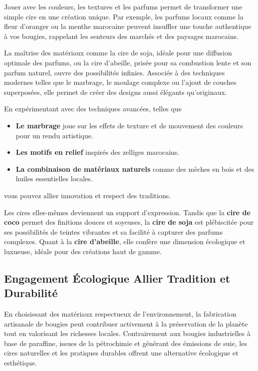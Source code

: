 \documentclass[11pt,fleqn,onecolumn,oneside]{book}
\begin{document}
Jouer avec les couleurs, les textures et les parfums permet de transformer une simple cire en une création unique. Par exemple, les parfums locaux comme la fleur d’oranger ou la menthe marocaine peuvent insuffler une touche authentique à vos bougies, rappelant les senteurs des marchés et des paysages marocains.

\begin{remark}
La maîtrise des matériaux comme la cire de soja, idéale pour une diffusion optimale des parfums, ou la cire d’abeille, prisée pour sa combustion lente et son parfum naturel, ouvre des possibilités infinies. Associée à des techniques modernes telles que le marbrage, le moulage complexe ou l’ajout de couches superposées, elle permet de créer des designs aussi élégants qu’originaux.
\end{remark}

En expérimentant avec des techniques avancées, telles que
\begin{itemize}
    \item \textbf{Le marbrage} joue sur les effets de texture et de mouvement des couleurs pour un rendu artistique.
    \item \textbf{Les motifs en relief} inspirés des zelliges marocains.
    \item \textbf{La combinaison de matériaux naturels} comme des mèches en bois et des huiles essentielles locales.
\end{itemize}
vous pouvez allier innovation et respect des traditions.

Les cires elles-mêmes deviennent un support d’expression. Tandis que la \textbf{cire de coco} permet des finitions douces et soyeuses, la \textbf{cire de soja} est plébiscitée pour ses possibilités de teintes vibrantes et sa facilité à capturer des parfums complexes. Quant à la \textbf{cire d’abeille}, elle confère une dimension écologique et luxueuse, idéale pour des créations haut de gamme.

\subsection*{Engagement Écologique Allier Tradition et Durabilité}

\begin{corollary}
En choisissant des matériaux respectueux de l’environnement, la fabrication artisanale de bougies peut contribuer activement à la préservation de la planète tout en valorisant les richesses locales. Contrairement aux bougies industrielles à base de paraffine, issues de la pétrochimie et générant des émissions de suie, les cires naturelles et les pratiques durables offrent une alternative écologique et esthétique.
\end{corollary}
\end{document}
